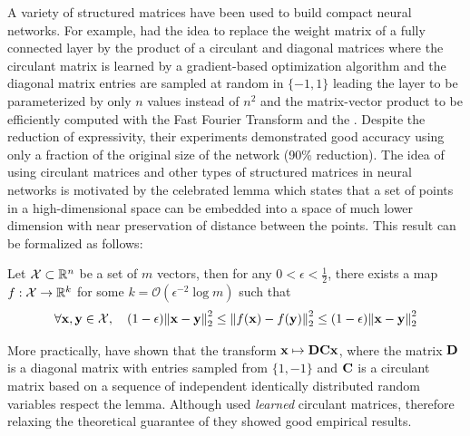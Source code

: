 

\drawstar

A variety of structured matrices have been used to build compact neural networks.
For example, \citet{cheng2015exploration} had the idea to replace the weight matrix of a fully connected layer by the product of a circulant and diagonal matrices where the circulant matrix is learned by a gradient-based optimization algorithm and the diagonal matrix entries are sampled at random in $\{-1, 1\}$ leading the layer to be parameterized by only $n$ values instead of $n^2$ and the matrix-vector product to be efficiently computed with the Fast Fourier Transform and the .
Despite the reduction of expressivity, their experiments demonstrated good accuracy using only a fraction of the original size of the network (90\% reduction).
The idea of using circulant matrices and other types of structured matrices in neural networks is motivated by the celebrated \citeauthor{johnson1984extensions} lemma which states that a set of points in a high-dimensional space can be embedded into a space of much lower dimension with near preservation of distance between the points.
This result can be formalized as follows:
\begin{lemma}
  Let $\mathcal{X} \subset \mathbb{R}^n$ be a set of $m$ vectors, then for any $0 < \epsilon < \frac{1}{2}$, there exists a map $f: \mathcal{X} \rightarrow \mathbb{R}^k$ for some $k = \mathcal{O}(\epsilon^{-2} \log m)$ such that
  \begin{equation}
    \forall \mathbf{x}, \mathbf{y} \in \mathcal{X}, \quad (1 - \epsilon) \norm{\mathbf{x} - \mathbf{y}}_2^2 \leq \norm{f(\mathbf{x}) - f(\mathbf{y})}_2^2 \leq (1 - \epsilon) \norm{\mathbf{x} - \mathbf{y}}_2^2 
  \end{equation}
\end{lemma}
\noindent
More practically, \citet{hinrichs2011johnson} have shown that the \DC transform $\mathbf{x} \mapsto \mathbf{D} \mathbf{C} \mathbf{x}$, where the matrix $\mathbf{D}$ is a diagonal matrix with entries sampled from $\{1, -1\}$ and $\mathbf{C}$ is a circulant matrix based on a sequence of independent identically distributed random variables respect the \citeauthor{johnson1984extensions} lemma.
Although \citet{cheng2015exploration} used \emph{learned} circulant matrices, therefore relaxing the theoretical guarantee of \citet{hinrichs2011johnson} they showed good empirical results. 

